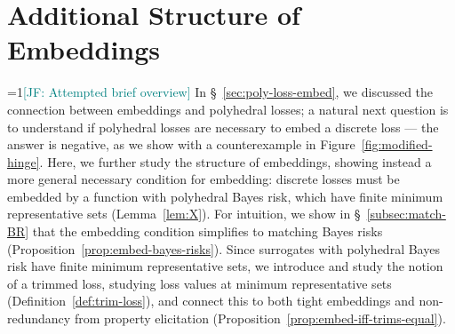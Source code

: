 \documentclass[11pt]{article}
\newcommand{\Comments}{1}
\newcommand{\mynote}[2]{\ifnum\Comments=1\textcolor{#1}{#2}\fi}
\newcommand{\mytodo}[2]{\ifnum\Comments=1%
  \todo[linecolor=#1!80!black,backgroundcolor=#1,bordercolor=#1!80!black]{#2}\fi}
\newcommand{\jessie}[1]{\mynote{teal}{[JF: #1]}}
\newcommand{\jessiet}[1]{\mytodo{teal!20!white}{JF: #1}}
\newcommand{\prop}[1]{\mathrm{prop}[#1]}
\newcommand{\simplex}{\Delta_\Y}
\newcommand{\Y}{\mathcal{Y}}
\newcommand{\inprod}[2]{\langle #1, #2 \rangle}%
\newcommand{\elltopk}{\ell^{\text{top-$k$}}}
\begin{document}
%
%
%
%





\section{Additional Structure of Embeddings}
\label{sec:min-rep-sets}

\jessie{Attempted brief overview}
In \S~\ref{sec:poly-loss-embed}, we discussed the connection between embeddings and polyhedral losses; a natural next question is to understand if polyhedral losses are necessary to embed a discrete loss --- the answer is negative, as we show with a counterexample in Figure~\ref{fig:modified-hinge}.
Here, we further study the structure of embeddings, showing instead a more general necessary condition for embedding: discrete losses must be embedded by a function with polyhedral Bayes risk, which have finite minimum representative sets (Lemma~\ref{lem:X}).
For intuition, we show in \S~\ref{subsec:match-BR} that the embedding condition simplifies to matching Bayes risks (Proposition~\ref{prop:embed-bayes-risks}).
Since surrogates with polyhedral Bayes risk have finite minimum representative sets, we introduce and study the notion of a trimmed loss, studying loss values at minimum representative sets (Definition~\ref{def:trim-loss}), and connect this to both tight embeddings and non-redundancy from property elicitation (Proposition~\ref{prop:embed-iff-trims-equal}).
 
\end{document}
